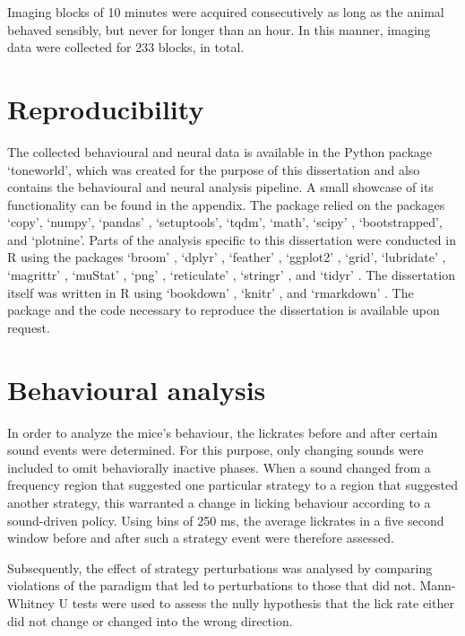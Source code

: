 \documentclass[]{report}
\theoremstyle{definition}
\theoremstyle{definition}
\theoremstyle{definition}
\theoremstyle{remark}
\begin{document}
Imaging blocks of 10 minutes were acquired consecutively as long as the
animal behaved sensibly, but never for longer than an hour. In this
manner, imaging data were collected for 233 blocks, in total.

\hypertarget{reproducibility}{%
\section{Reproducibility}\label{reproducibility}}

The collected behavioural and neural data is available in the Python
package `toneworld', which was created for the purpose of this
dissertation and also contains the behavioural and neural analysis
pipeline. A small showcase of its functionality can be found in the
appendix. The package relied on the packages `copy', `numpy', `pandas'
\citep{pandas}, `setuptools', `tqdm', `math', `scipy' \citep{scipy},
`bootstrapped', and `plotnine'. Parts of the analysis specific to this
dissertation were conducted in R \citep{R-base} using the packages
`broom' \citep{R-broom}, `dplyr' \citep{R-dplyr}, `feather'
\citep{R-feather}, `ggplot2' \citep{R-ggplot2}, `grid', `lubridate'
\citep{R-lubridate}, `magrittr' \citep{R-magrittr}, `muStat'
\citep{R-muStat}, `png' \citep{R-png}, `reticulate'
\citep{R-reticulate}, `stringr' \citep{R-stringr}, and `tidyr'
\citep{R-tidyr}. The dissertation itself was written in R using
`bookdown' \citep{R-bookdown}, `knitr' \citep{R-knitr}, and `rmarkdown'
\citep{R-rmarkdown}. The package and the code necessary to reproduce the
dissertation is available upon request.

\hypertarget{behavioural-analysis}{%
\section{Behavioural analysis}\label{behavioural-analysis}}

In order to analyze the mice's behaviour, the lickrates before and after
certain sound events were determined. For this purpose, only changing
sounds were included to omit behaviorally inactive phases. When a sound
changed from a frequency region that suggested one particular strategy
to a region that suggested another strategy, this warranted a change in
licking behaviour according to a sound-driven policy. Using bins of 250
ms, the average lickrates in a five second window before and after such
a strategy event were therefore assessed.

Subsequently, the effect of strategy perturbations was analysed by
comparing violations of the paradigm that led to perturbations to those
that did not. Mann-Whitney U tests \citep{hodges1956nonparametric} were
used to assess the nully hypothesis that the lick rate either did not
change or changed into the wrong direction.
\end{document}
